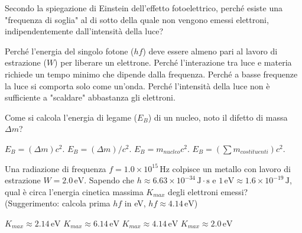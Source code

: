 \documentclass{exam}%
\begin{document}
\begin{questions}
\begin{choices}
\end{choices}%
\question Secondo la spiegazione di Einstein dell'effetto fotoelettrico, perché esiste una "frequenza di soglia" al di sotto della quale non vengono emessi elettroni, indipendentemente dall'intensità della luce?%
\vspace{0.2em}%
\begin{choices}%
\choice Perché l'energia del singolo fotone ($hf$) deve essere almeno pari al lavoro di estrazione ($W$) per liberare un elettrone.%
\choice Perché l'interazione tra luce e materia richiede un tempo minimo che dipende dalla frequenza.%
\choice Perché a basse frequenze la luce si comporta solo come un'onda.%
\choice Perché l'intensità della luce non è sufficiente a "scaldare" abbastanza gli elettroni.%
\end{choices}%
\question Come si calcola l'energia di legame ($E_B$) di un nucleo, noto il difetto di massa $\Delta m$?%
\vspace{0.2em}%
\begin{multicols}{4}%
\begin{choices}%
\choice $E_B = (\Delta m) c^2$.%
\choice $E_B = (\Delta m) / c^2$.%
\choice $E_B = m_{nucleo} c^2$.%
\choice $E_B = (\sum m_{costituenti}) c^2$.%
\end{choices}%
\end{multicols}%
\question Una radiazione di frequenza $f = 1.0 \times 10^{15} \, \text{Hz}$ colpisce un metallo con lavoro di estrazione $W = 2.0 \, \text{eV}$. Sapendo che $h \approx 6.63 \times 10^{-34} \, \text{J} \cdot \text{s}$ e $1 \, \text{eV} \approx 1.6 \times 10^{-19} \, \text{J}$, qual è circa l'energia cinetica massima $K_{max}$ degli elettroni emessi? (Suggerimento: calcola prima $hf$ in eV, $hf \approx 4.14 \, \text{eV}$)%
\vspace{0.2em}%
\begin{multicols}{4}%
\begin{choices}%
\choice $K_{max} \approx 2.14 \, \text{eV}$%
\choice $K_{max} \approx 6.14 \, \text{eV}$%
\choice $K_{max} \approx 4.14 \, \text{eV}$%
\choice $K_{max} \approx 2.0 \, \text{eV}$%
\end{choices}%
\end{multicols}%
\end{questions}%
\end{document}
